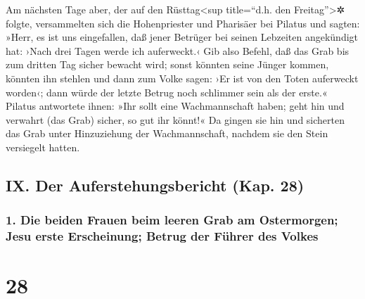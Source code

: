  Am nächsten Tage aber, der auf den Rüsttag\textless sup
title=``d.h. den Freitag''\textgreater✲ folgte, versammelten sich die
Hohenpriester und Pharisäer bei Pilatus  und sagten:
»Herr, es ist uns eingefallen, daß jener Betrüger bei seinen Lebzeiten
angekündigt hat: ›Nach drei Tagen werde ich auferweckt.‹ 
Gib also Befehl, daß das Grab bis zum dritten Tag sicher bewacht wird;
sonst könnten seine Jünger kommen, könnten ihn stehlen und dann zum
Volke sagen: ›Er ist von den Toten auferweckt worden‹; dann würde der
letzte Betrug noch schlimmer sein als der erste.« 
Pilatus antwortete ihnen: »Ihr sollt eine Wachmannschaft haben; geht hin
und verwahrt (das Grab) sicher, so gut ihr könnt!«  Da
gingen sie hin und sicherten das Grab unter Hinzuziehung der
Wachmannschaft, nachdem sie den Stein versiegelt hatten.

\hypertarget{ix.-der-auferstehungsbericht-kap.-28}{%
\subsection{IX. Der Auferstehungsbericht (Kap.
28)}\label{ix.-der-auferstehungsbericht-kap.-28}}

\hypertarget{die-beiden-frauen-beim-leeren-grab-am-ostermorgen-jesu-erste-erscheinung-betrug-der-fuxfchrer-des-volkes}{%
\subsubsection{1. Die beiden Frauen beim leeren Grab am Ostermorgen;
Jesu erste Erscheinung; Betrug der Führer des
Volkes}\label{die-beiden-frauen-beim-leeren-grab-am-ostermorgen-jesu-erste-erscheinung-betrug-der-fuxfchrer-des-volkes}}

\hypertarget{section-27}{%
\section{28}\label{section-27}}

